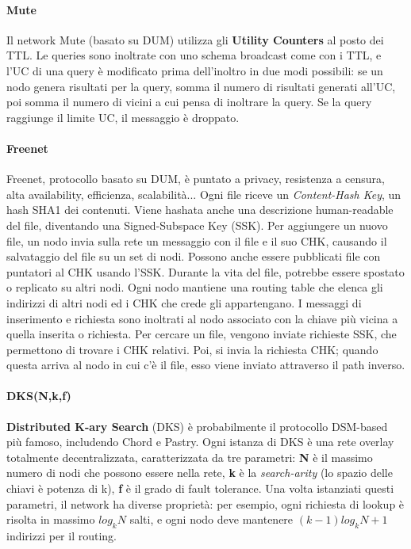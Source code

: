 \documentclass[11pt]{article}
\begin{document}
\paragraph{Mute} Il network Mute (basato su DUM) utilizza gli \textbf{Utility Counters} al posto dei TTL. Le queries sono inoltrate con uno schema broadcast come con i TTL, e l'UC di una query è modificato prima dell'inoltro in due modi possibili: se un nodo genera risultati per la query, somma il numero di risultati generati all'UC, poi somma il numero di vicini a cui pensa di inoltrare la query. Se la query raggiunge il limite UC, il messaggio è droppato.

\paragraph{Freenet} Freenet, protocollo basato su DUM, è puntato a privacy, resistenza a censura, alta availability, efficienza, scalabilità... Ogni file riceve un \textit{Content-Hash Key}, un hash SHA1 dei contenuti. Viene hashata anche una descrizione human-readable del file, diventando una Signed-Subspace Key (SSK). Per aggiungere un nuovo file, un nodo invia sulla rete un messaggio con il file e il suo CHK, causando il salvataggio del file su un set di nodi. Possono anche essere pubblicati file con puntatori al CHK usando l'SSK. Durante la vita del file, potrebbe essere spostato o replicato su altri nodi. Ogni nodo mantiene una routing table che elenca gli indirizzi di altri nodi ed i CHK che crede gli appartengano. I messaggi di inserimento e richiesta sono inoltrati al nodo associato con la chiave più vicina a quella inserita o richiesta. Per cercare un file, vengono inviate richieste SSK, che permettono di trovare i CHK relativi. Poi, si invia la richiesta CHK; quando questa arriva al nodo in cui c'è il file, esso viene inviato attraverso il path inverso.

\paragraph{DKS(N,k,f)} \textbf{Distributed K-ary Search} (DKS) è probabilmente il protocollo DSM-based più famoso, includendo Chord e Pastry. Ogni istanza di DKS è una rete overlay totalmente decentralizzata, caratterizzata da tre parametri: \textbf{N} è il massimo numero di nodi che possono essere nella rete, \textbf{k} è la \textit{search-arity} (lo spazio delle chiavi è potenza di k), \textbf{f} è il grado di fault tolerance. Una volta istanziati questi parametri, il network ha diverse proprietà: per esempio, ogni richiesta di lookup è risolta in massimo $log_k N$ salti, e ogni nodo deve mantenere $(k-1)log_kN+1$ indirizzi per il routing. 
\end{document}
